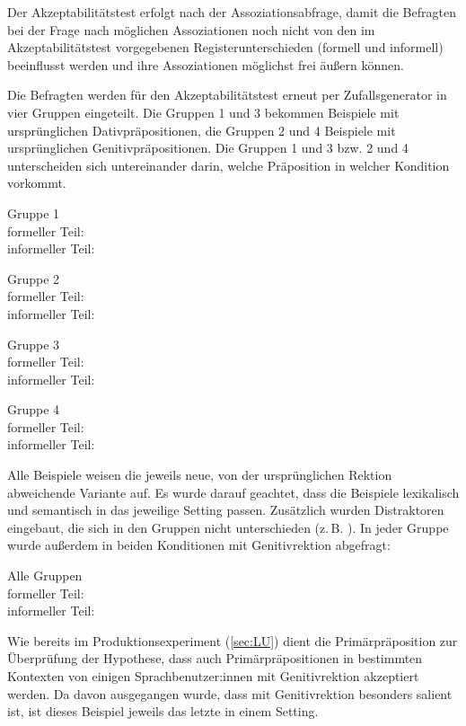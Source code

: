 Der Akzeptabilitätstest erfolgt nach der Assoziationsabfrage, damit die Befragten bei der Frage nach möglichen Assoziationen noch nicht von den im Akzeptabilitätstest vorgegebenen Registerunterschieden (formell und informell) beeinflusst werden und ihre Assoziationen möglichst frei äußern können. 

Die Befragten werden für den Akzeptabilitätstest erneut per Zufallsgenerator in vier Gruppen eingeteilt. 
Die Gruppen 1 und 3 bekommen Beispiele mit ursprünglichen Dativpräpositionen, die Gruppen 2 und 4 Beispiele mit ursprünglichen Genitivpräpositionen. 
Die Gruppen 1 und 3 bzw. 2 und 4 unterscheiden sich untereinander darin, welche Präposition in welcher Kondition vorkommt. 
\begin{description}
\item Gruppe 1\\ formeller Teil: \\ informeller Teil: 
\item Gruppe 2\\ formeller Teil: \\ informeller Teil: 
\item Gruppe 3\\ formeller Teil: \\ informeller Teil: 
\item Gruppe 4\\ formeller Teil: \\ informeller Teil: 
\end{description}
Alle Beispiele weisen die jeweils neue, von der ursprünglichen Rektion abweichende Variante auf. 
Es wurde darauf geachtet, dass die Beispiele lexikalisch und semantisch in das jeweilige Setting passen. 
Zusätzlich wurden Distraktoren eingebaut, die sich in den Gruppen nicht unterschieden (z.\,B. ). 
In jeder Gruppe wurde außerdem in beiden Konditionen  mit Genitivrektion abgefragt:
\begin{description}
\item Alle Gruppen\\ formeller Teil: \\ informeller Teil: 
\end{description}
Wie bereits im Produktionsexperiment (\autoref{sec:LU}) dient die Primärpräposition zur Überprüfung der Hypothese, dass auch Primärpräpositionen in bestimmten Kontexten von einigen Sprachbenutzer:innen mit Genitivrektion akzeptiert werden. 
Da davon ausgegangen wurde, dass  mit Genitivrektion besonders salient ist, ist dieses Beispiel jeweils das letzte in einem Setting. 

